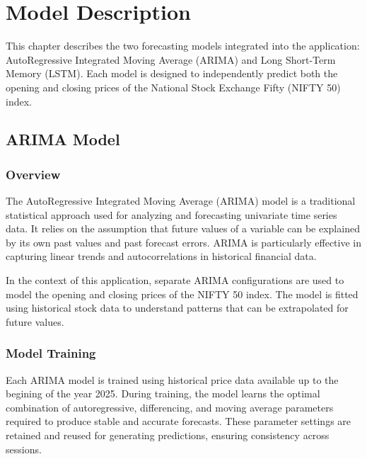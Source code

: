 %
%

\chapter{Model Description}

This chapter describes the two forecasting models integrated into the application: AutoRegressive Integrated Moving Average (ARIMA) and Long Short-Term Memory (LSTM). Each model is designed to independently predict both the opening and closing prices of the National Stock Exchange Fifty (NIFTY 50) index.

\section{ARIMA Model}

\subsection{Overview}
The AutoRegressive Integrated Moving Average (ARIMA) model is a traditional statistical approach used for analyzing and forecasting univariate time series data. It relies on the assumption that future values of a variable can be explained by its own past values and past forecast errors. ARIMA is particularly effective in capturing linear trends and autocorrelations in historical financial data.

In the context of this application, separate ARIMA configurations are used to model the opening and closing prices of the NIFTY 50 index. The model is fitted using historical stock data to understand patterns that can be extrapolated for future values.

\subsection{Model Training}
Each ARIMA model is trained using historical price data available up to the begining of the year 2025. During training, the model learns the optimal combination of autoregressive, differencing, and moving average parameters required to produce stable and accurate forecasts. These parameter settings are retained and reused for generating predictions, ensuring consistency across sessions.

